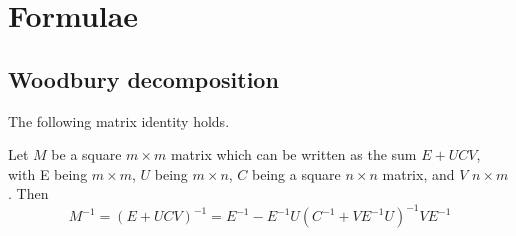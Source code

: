 \chapter{Formulae}
\section{Woodbury decomposition}
\label{sec:wood}
The following matrix identity holds.
\begin{proposition}
	Let $M$ be a square $m\times m$ matrix which can be written as the sum $E+UCV$, with E being $m \times m$, $U$ being $m\times n$, $C$ being a square $n\times n$ matrix, and $V$ $n\times m$. Then
	\begin{equation}
		\label{wood}
		M^{-1}=
		\left(E + UCV \right)^{-1} = E^{-1} - E^{-1}U\left(C^{-1} + V E^{-1}U\right)^{-1}V E^{-1}
	\end{equation}
\end{proposition}


